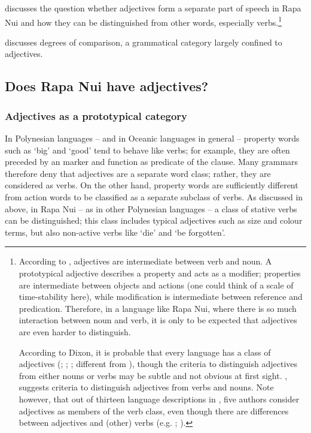   
 discusses the question whether adjectives form a separate part of speech in Rapa Nui and how they can be distinguished from other words, especially verbs.\footnote{\label{fn:119}According to \citet{Croft2000}, adjectives are intermediate between verb and noun. A prototypical adjective describes a property and acts as a modifier; properties are intermediate between objects and actions (one could think of a scale of time-stability here), while modification is intermediate between reference and predication. Therefore, in a language like Rapa Nui, where there is so much interaction between noun and verb, it is only to be expected that adjectives are even harder to distinguish.

According to Dixon, it is probable that every language has a class of adjectives (\citealt{Dixon2004}; \citealt[53]{Dixon2010-1}; \citealt[62, 104]{Dixon2010-2}; different from \citealt{Dixon1982}), though the criteria to distinguish adjectives from either nouns or verbs may be subtle and not obvious at first sight. \citet{Dixon2004}, \citet[70–73]{Dixon2010-2} suggests criteria to distinguish adjectives from verbs and nouns. Note however, that out of thirteen language descriptions in \citet{AikhenvaldDixon2004}, five authors consider adjectives as members of the verb class, even though there are differences between adjectives and (other) verbs (e.g. \citealt{Hajek2004}; \citealt{Hyslop2004}).}  

 discusses degrees of comparison, a grammatical category largely confined to adjectives.

\subsection{Does Rapa Nui have adjectives?}\label{sec:3.5.1}
\subsubsection[Adjectives as a prototypical category]{Adjectives as a prototypical category}\label{sec:3.5.1.1}
In Polynesian languages – and in Oceanic languages in general – property words such as ‘big’ and ‘good’ tend to behave like verbs; for example, they are often preceded by an  marker and function as predicate of the clause. Many grammars therefore deny that adjectives are a separate word class; rather, they are considered as verbs. On the other hand, property words are sufficiently different from action words to be classified as a separate subclass of verbs. As discussed in  above, in Rapa Nui – as in other Polynesian languages – a class of stative verbs can be distinguished; this class includes typical adjectives such as size and colour terms, but also non-active verbs like ‘die’ and ‘be forgotten’. 


